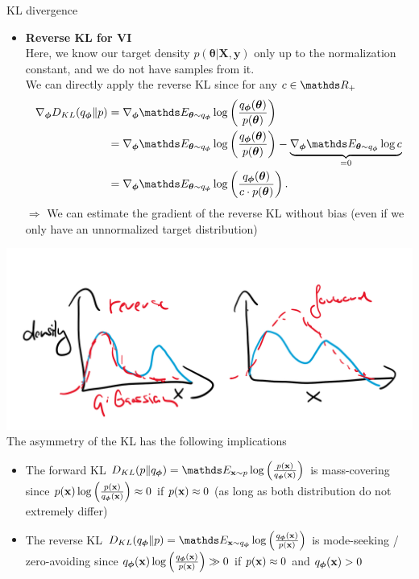 \documentclass[11pt,compress,t,notes=noshow, xcolor=table]{beamer}
\begin{document}
\begin{vbframe}{KL divergence}
\begin{itemize}
\end{itemize}
 \framebreak

 \begin{itemize}
     \item \textbf{Reverse KL for VI} \\
     Here, we know our target density $p(\bm{\theta}\vert \mathbf{X}, \mathbf{y})$ only up to the normalization constant, and we do not have samples from it. \\
     \lz
     We can directly apply the reverse KL since for any $c\in \R_+$
     \begin{align*}
         \nabla_{\bm{\phi}} D_{KL}(q_{\bm{\phi}}\|p) &= \nabla_{\bm{\phi}} \E_{\bm{\theta} \sim q_{\bm{\phi}}}\log\left(\frac{q_{\bm{\phi}}(\bm{\theta})}{p(\bm{\theta})}\right) \\
         &= \nabla_{\bm{\phi}} \E_{\bm{\theta} \sim q_{\bm{\phi}}}\log\left(\frac{q_{\bm{\phi}}(\bm{\theta})}{p(\bm{\theta})}\right) - \underbrace{\nabla_{\bm{\phi}} \E_{\bm{\theta} \sim q_{\bm{\phi}}}\log c}_{=0}\\
         &= \nabla_{\bm{\phi}} \E_{\bm{\theta} \sim q_{\bm{\phi}}}\log\left(\frac{q_{\bm{\phi}}(\bm{\theta})}{c\cdot p(\bm{\theta})}\right).
     \end{align*}
     $\Rightarrow$ We can estimate the gradient of the reverse KL without bias (even if we only have an unnormalized target distribution)
 \end{itemize}
 \framebreak

\includegraphics[width=0.6\linewidth]{figure_man/kl_ml_fkl_rkl.png} \\
The asymmetry of the KL has the following implications
\begin{itemize}
    \item The forward KL $D_{KL}(p\|q_{\bm{\phi}}) = \E_{\xv \sim p} \log\left(\frac{p(\xv)}{q_{\bm{\phi}}(\xv)}\right)$ is mass-covering since $p(\mathbf{x})\log\left(\frac{p(\mathbf{x})}{q_{\bm{\phi}}(\mathbf{x})}\right) \approx 0$ if $p(\mathbf{x}) \approx 0$ (as long as both distribution do not extremely differ)
        \item The reverse KL $D_{KL}(q_{\bm{\phi}}\|p) = \E_{\xv \sim q_{\bm{\phi}}} \log\left(\frac{q_{\bm{\phi}}(\xv)}{p(\xv)}\right)$ is mode-seeking / zero-avoiding since $q_{\bm{\phi}}(\mathbf{x})\log\left(\frac{q_{\bm{\phi}}(\mathbf{x})}{p(\mathbf{x})}\right) \gg 0$ if $p(\mathbf{x}) \approx 0$ and $q_{\bm{\phi}}(\mathbf{x}) > 0$ 
\end{itemize}
 
\end{vbframe}

\endlecture
\end{document}

